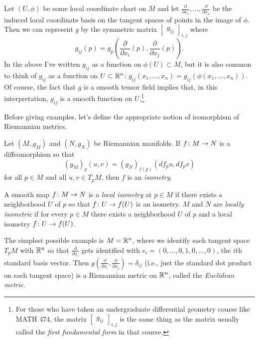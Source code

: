 Let $(U,\phi)$ be some local coordinate chart on $M$ and let $\frac{\partial}{\partial x_1}, \dots , \frac{\partial}{\partial x_n}$ be the induced local coordinate basis on the tangent spaces of points in the image of $\phi$. Then we can represent $g$ by the symmetric matrix $\begin{bmatrix} g_{ij} \end{bmatrix}_{i,j}$ where
\[
	g_{ij}(p) = g_p\left(\frac{\partial}{\partial x_i}(p) , \frac{\partial}{\partial x_j}(p)\right).
\]
In the above I've written $g_{ij}$ as a function on $\phi(U) \subset M$, but it is also common to think of $g_{ij}$ as a function on $U \subset \mathbb{R}^n$: $g_{ij}(x_1, \dots , x_n) = g_{ij}(\phi(x_1, \dots , x_n))$. Of course, the fact that $g$ is a smooth tensor field implies that, in this interpretation, $g_{ij}$ is a smooth function on $U$.\footnote{For those who have taken an undergraduate differential geometry course like MATH 474, the matrix $\begin{bmatrix} g_{ij} \end{bmatrix}_{i,j}$ is the same thing as the matrix usually called the \emph{first fundamental form} in that course.}

Before giving examples, let's define the appropriate notion of isomorphism of Riemannian metrics.

\begin{definition}\label{def:isometry}
	Let $(M,g_M)$ and $(N,g_N)$ be Riemannian manifolds. If $f \colon\thinspace\! M \to N$ is a diffeomorphism so that
	\[
		(g_M)_p(u,v) = (g_N)_{f(p)}(df_p u, df_p v)
	\]
	for all $p \in M$ and all $u,v \in T_pM$, then $f$ is an \emph{isometry}.
	
	A smooth map $f \colon\thinspace\! M \to N$ is a \emph{local isometry} at $p \in M$ if there exists a neighborhood $U$ of $p$ so that $f \colon\thinspace\! U \to f(U)$ is an isometry. $M$ and $N$ are \emph{locally isometric} if for every $p \in M$ there exists a neighborhood $U$ of $p$ and a local isometry $f \colon\thinspace\! U \to f(U)$.
\end{definition}

\begin{example}
	The simplest possible example is $M = \mathbb{R}^n$, where we identify each tangent space $T_pM$ with $\mathbb{R}^n$ so that $\frac{\partial}{\partial x_i}$ gets identified with $e_i = (0, \dots , 0, 1, 0, \dots , 0)$, the $i$th standard basis vector. Then $g\left(\frac{\partial}{\partial x_i} , \frac{\partial}{\partial x_j} \right) = \delta_{ij}$ (i.e., just the standard dot product on each tangent space) is a Riemannian metric on $\mathbb{R}^n$, called the \emph{Euclidean metric}.
\end{example}

